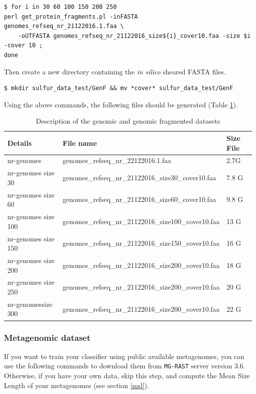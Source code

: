 \documentclass[12pt]{report}
\begin{document}
\begin{verbatim}
$ for i in 30 60 100 150 200 250 
perl get_protein_fragments.pl -inFASTA genomes_refseq_nr_21122016.1.faa \
	-oUTFASTA genomes_refseq_nr_21122016_size${i}_cover10.faa -size $i -cover 10 ;
done 
\end{verbatim}

Then create a new directory containing the \textit{in silico} sheared FASTA files. 
\begin{verbatim}
$ mkdir sulfur_data_test/GenF && mv *cover* sulfur_data_test/GenF
\end{verbatim}
\label{directory_genF}
Using the above commands, the following files should be generated (Table \ref{sizes}).  

\begin{table}[H]
\centering
\caption{Description of the genomic and genomic fragmented datasets}
\label{sizes}
\begin{tabular}{@{}lll@{}}
\toprule
Details             & File name                                           & Size File \\ \midrule
nr-genomes          & genomes\_refseq\_nr\_22122016.1.faa                 & 2.7G      \\
nr-genomes size 30  & genomes\_refseq\_nr\_21122016\_size30\_cover10.faa  & 7.8 G     \\
nr-genomes size 60  & genomes\_refseq\_nr\_21122016\_size60\_cover10.faa  & 9.8 G     \\
nr-genomes size 100 & genomes\_refseq\_nr\_21122016\_size100\_cover10.faa & 13 G      \\
nr-genomes size 150 & genomes\_refseq\_nr\_21122016\_size150\_cover10.faa & 16 G      \\
nr-genomes size 200 & genomes\_refseq\_nr\_21122016\_size200\_cover10.faa & 18 G      \\
nr-genomes size 250 & genomes\_refseq\_nr\_21122016\_size200\_cover10.faa & 20 G      \\
nr-genomessize 300  & genomes\_refseq\_nr\_21122016\_size200\_cover10.faa & 22 G      \\ \bottomrule
\end{tabular}
\end{table}

\subsubsection{Metagenomic dataset}

If you want to train your classifier  using public available metagenomes, you can
use the following commands to download them from \texttt{MG-RAST} server version 3.6. Otherwise, if
you have your own data, skip this step, and compute the Mean Size Length of your  metagenomes (see section \ref{msl}).
\end{document}
